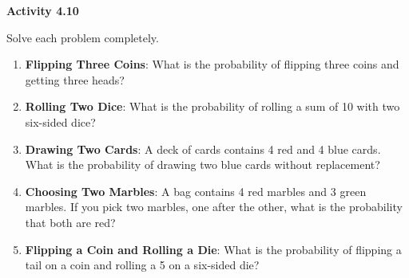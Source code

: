  \vspace{0.3ex}
\noindent\textbf{Activity 4.10}

\vspace{0.2ex}

Solve each problem completely.
\begin{enumerate}[noitemsep, label = \color{blue}\arabic*. ]
				
    \item \textbf{Flipping Three Coins}: What is the probability of flipping three coins and getting three heads? 
    
    \item \textbf{Rolling Two Dice}: What is the probability of rolling a sum of 10 with two six-sided dice?  
    
    \item \textbf{Drawing Two Cards}: A deck of cards contains 4 red and 4 blue cards. What is the probability of drawing two blue cards without replacement? 
    
    \item \textbf{Choosing Two Marbles}: A bag contains 4 red marbles and 3 green marbles. If you pick two marbles, one after the other, what is the probability that both are red? 
    
    \item \textbf{Flipping a Coin and Rolling a Die}: What is the probability of flipping a tail on a coin and rolling a 5 on a six-sided die? 
    
    
    
    
    
\end{enumerate}


